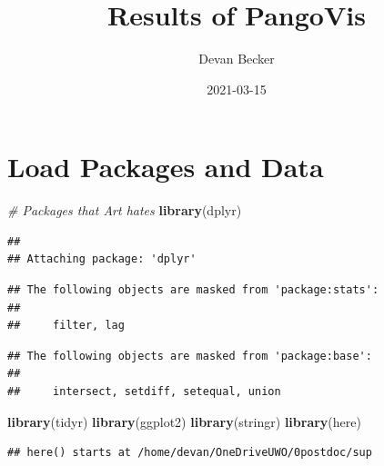 \documentclass[]{article}
\title{Results of PangoVis}
\author{Devan Becker}
\date{2021-03-15}
\newenvironment{Shaded}{\begin{snugshade}}{\end{snugshade}}
\newcommand{\CommentTok}[1]{\textcolor[rgb]{0.56,0.35,0.01}{\textit{#1}}}
\newcommand{\KeywordTok}[1]{\textcolor[rgb]{0.13,0.29,0.53}{\textbf{#1}}}
\newcommand{\NormalTok}[1]{#1}
\begin{document}
\maketitle

\hypertarget{load-packages-and-data}{%
\section{Load Packages and Data}\label{load-packages-and-data}}

\begin{Shaded}
\begin{Highlighting}[]
\CommentTok{# Packages that Art hates}
\KeywordTok{library}\NormalTok{(dplyr)}
\end{Highlighting}
\end{Shaded}

\begin{verbatim}
## 
## Attaching package: 'dplyr'
\end{verbatim}

\begin{verbatim}
## The following objects are masked from 'package:stats':
## 
##     filter, lag
\end{verbatim}

\begin{verbatim}
## The following objects are masked from 'package:base':
## 
##     intersect, setdiff, setequal, union
\end{verbatim}

\begin{Shaded}
\begin{Highlighting}[]
\KeywordTok{library}\NormalTok{(tidyr)}
\KeywordTok{library}\NormalTok{(ggplot2)}
\KeywordTok{library}\NormalTok{(stringr)}
\KeywordTok{library}\NormalTok{(here)}
\end{Highlighting}
\end{Shaded}

\begin{verbatim}
## here() starts at /home/devan/OneDriveUWO/0postdoc/sup
\end{verbatim}
\end{document}
